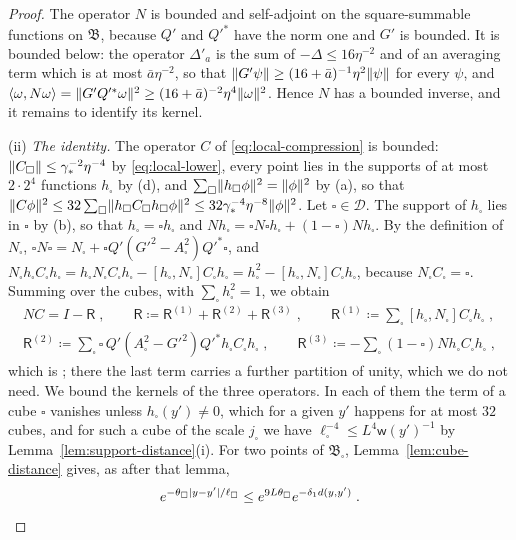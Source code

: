 \documentclass[11pt]{preprint}
\DeclarePairedDelimiter{\abs}{\lvert}{\rvert}
\DeclarePairedDelimiter{\norm}{\lVert}{\rVert}
\numberwithin{equation}{section}
\theoremstyle{definition}
\theoremstyle{remark}
\theoremstyle{plain}
\begin{document}
\begin{proof}
The operator $N$ is bounded and self-adjoint on the square-summable functions on $\mathfrak B$, because $Q'$ and $Q'^*$ have the norm one and $G'$ is bounded. It is bounded below: the operator $\Delta'_a$ is the sum of $-\Delta \leq 16\eta^{-2}$ and of an averaging term which is at most $\bar a\eta^{-2}$, so that $\norm{G'\psi} \geq (16 + \bar a)^{-1}\eta^2\norm\psi$ for every $\psi$, and $\langle\omega, N\omega\rangle = \norm{G'Q'^*\omega}^2 \geq (16 + \bar a)^{-2}\eta^4\norm\omega^2$. Hence $N$ has a bounded inverse, and it remains to identify its kernel.

(ii) \emph{The identity.} The operator $C$ of \eqref{eq:local-compression} is bounded: $\norm{C_\square} \leq \gamma_*^{-2}\eta^{-4}$ by \eqref{eq:local-lower}, every point lies in the supports of at most $2 \cdot 2^4$ functions $h_\square$ by (d), and $\sum_\square\norm{h_\square\phi}^2 = \norm\phi^2$ by (a), so that $\norm{C\phi}^2 \leq 32\sum_\square\norm{h_\square C_\square h_\square\phi}^2 \leq 32\gamma_*^{-4}\eta^{-8}\norm\phi^2$. Let $\square \in \mathscr D$. The support of $h_\square$ lies in $\square$ by (b), so that $h_\square = \square h_\square$ and $Nh_\square = \square N\square h_\square + (1 - \square)Nh_\square$. By the definition of $N_\square$, $\square N\square = N_\square + \square Q'(G'^2 - A_\square^2)Q'^*\square$, and $N_\square h_\square C_\square h_\square = h_\square N_\square C_\square h_\square - [h_\square, N_\square]C_\square h_\square = h_\square^2 - [h_\square, N_\square]C_\square h_\square$, because $N_\square C_\square = \square$. Summing over the cubes, with $\sum_\square h_\square^2 = 1$, we obtain
\begin{equation}\label{eq:approximate-inverse}
\begin{gathered}
    NC = I - \mathsf R\;,
    \qquad
    \mathsf R \coloneqq \mathsf R^{(1)} + \mathsf R^{(2)} + \mathsf R^{(3)}\;,
    \qquad
    \mathsf R^{(1)} \coloneqq \sum_\square[h_\square, N_\square]C_\square h_\square\;,\\
    \mathsf R^{(2)} \coloneqq \sum_\square\square\,Q'(A_\square^2 - G'^2)Q'^*h_\square C_\square h_\square\;,
    \qquad
    \mathsf R^{(3)} \coloneqq -\sum_\square(1 - \square)Nh_\square C_\square h_\square\;,
\end{gathered}
\end{equation}
which is \cite[(2.82)]{BalabanPRT2}; there the last term carries a further partition of unity, which we do not need. We bound the kernels of the three operators. In each of them the term of a cube $\square$ vanishes unless $h_\square(y') \neq 0$, which for a given $y'$ happens for at most $32$ cubes, and for such a cube of the scale $j_\square$ we have $\ell_\square^{-4} \leq L^4\mathsf w(y')^{-1}$ by Lemma~\ref{lem:support-distance}(i). For two points of $\mathfrak B_\square$, Lemma~\ref{lem:cube-distance} gives, as after that lemma,
\begin{equation}\label{eq:euclidean-to-chain}
    e^{-\theta_\square\abs{y - y'}/\ell_\square} \leq e^{9L\theta_\square}e^{-\delta_1d(y, y')}\;.
\end{equation}


\end{proof}
\end{document}
